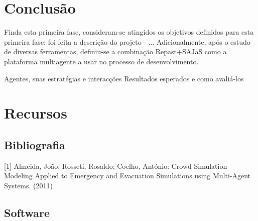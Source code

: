 \documentclass[12pt]{article}
\begin{document}
\begin{titlepage}
\section{Conclusão}

Finda esta primeira fase, consideram-se atingidos os objetivos definidos para esta primeira fase: foi feita a descrição do projeto - ... Adicionalmente, após o estudo de diversas ferramentas, definiu-se a combinação Repast+SAJaS como a plataforma multiagente a usar no processo de  desenvolvimento.

Agentes, suas estratégias e interacções
Resultados esperados e como avaliá-los

\section{Recursos}
\subsection{Bibliografia}
[1] Almeida, João; Rosseti, Rosaldo; Coelho, António: Crowd Simulation Modeling Applied to Emergency and Evacuation Simulations using Multi-Agent Systems. (2011)

\subsection{Software}

\end{titlepage}
\end{document}
